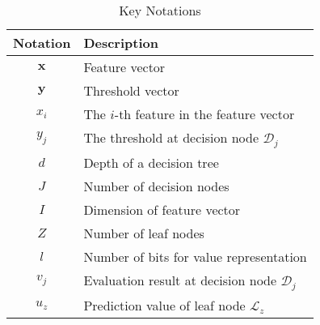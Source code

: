 \documentclass[10pt,journal,compsoc]{IEEEtran}
\begin{document}
\begin{table}[t!]

\centering
\caption{Key Notations}
\begin{tabular}{@{}c|l@{}}
\toprule
Notation & Description                           \\ \hline

$\mathbf{x}$ & Feature vector\\
$\mathbf{y}$ & Threshold vector \\
$x_i$        & The $i$-th feature in the feature vector                        \\ 
$y_j$        & The threshold at decision node $\mathcal{D}_j$                       \\ 
$d$ & Depth of a decision tree \\
$J $       & Number of decision nodes              \\ 
$I$       & Dimension of feature vector           \\ 
$Z$       & Number of leaf nodes              \\ 
$l$ & Number of bits for value representation \\ 
$v_j$     & Evaluation result at decision node $\mathcal{D}_j$ \\
$u_z$     & Prediction value of leaf node $\mathcal{L}_z$ \\ \bottomrule
\end{tabular}
\label{table:notations}
\end{table}
\end{document}

